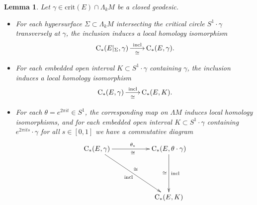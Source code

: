\documentclass[reqno]{amsart}
\numberwithin{equation}{section}
\theoremstyle{personal}%
\newtheorem{lem}[thm]{Lemma}
\theoremstyle{definition}
\newcommand{\incl}{\mathrm{incl}}
\newcommand{\crit}{\mathrm{crit}}
\newcommand{\Loc}{\mathrm{C}}
\DeclareRobustCommand{\llongrightarrow}{\relbar\joinrel\relbar\joinrel\rightarrow}
\DeclareMathOperator*{\ttoup}{\llongrightarrow}
\begin{document}
\begin{lem}\label{l:local_homology_and_shift}
Let $\gamma\in\crit(E)\cap\Lambda_kM$ be a closed geodesic. 
\begin{itemize}
\item[(i)] For each hypersurface $\Sigma\subset \Lambda_kM$ intersecting the critical circle $S^1\cdot\gamma$ transversely at $\gamma$, the inclusion induces a local homology isomorphism
\begin{align*}
\Loc_*(E|_{\Sigma},\gamma)
\ttoup_{\cong}^{\incl}
\Loc_*(E,\gamma).
\end{align*}

\item[(ii)] For each embedded open interval $K\subset S^1\cdot\gamma$ containing $\gamma$, the inclusion induces a local homology isomorphism
\begin{align*}
\Loc_*(E,\gamma)
\ttoup_{\cong}^{\incl}
\Loc_*(E,K).
\end{align*}

\item[(iii)] For each $\theta=e^{2\pi i t}\in S^1$, the corresponding map on  $\Lambda M$ induces local homology isomorphisms, and for each embedded open interval $K\subset S^1\cdot\gamma$ containing  $e^{2\pi i t s}\cdot\gamma$ for all $s\in[0,1]$  we have a commutative diagram
\begin{align*}
\xymatrix{
\Loc_*(E,\gamma)
\ar[rr]_{\cong}^{\theta_*}
\ar[ddrr]_{\incl}^\cong
&&
\Loc_*(E,\theta\cdot\gamma)
\ar[dd]^{\incl}_\cong
\\\\
&&
\Loc_*(E,K)
} 
\end{align*}
\end{itemize}
\end{lem}
\end{document}
